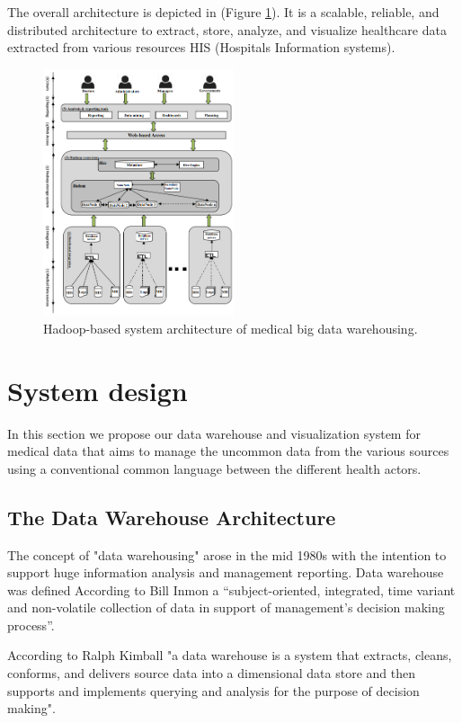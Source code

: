 \begin{itemize}
    The overall architecture is depicted in (Figure \ref{fig:bigdatarelated}). It is a scalable, reliable, and distributed architecture to extract, store, analyze, and visualize healthcare data extracted from various resources HIS (Hospitals Information systems).
    \begin{figure}[h!]
      \center
      \includegraphics[width=0.50\textwidth]{images/chapter2/relatedworkHadoop.PNG}
      \caption{Hadoop-based system
      architecture of medical big data warehousing.}
      \label{fig:bigdatarelated}
    \end{figure}
\end{itemize}


\section{System design}
In this section we propose our data warehouse and visualization system for medical data that aims to manage the uncommon data from the various sources using a conventional common language between the different health actors.
\subsection{The Data Warehouse Architecture}
The concept of "data warehousing" arose in the mid 1980s with the intention to support huge information analysis and management reporting\cite{wahDevelopmentDataWarehouse2009}. Data warehouse was defined According to Bill Inmon a “subject-oriented, integrated, time variant and non-volatile collection of data in support of management’s decision making process”\cite{inmonBuildingDataWarehouse2005}.
 
 
According to Ralph Kimball "a data warehouse is a system that extracts, cleans, conforms, and delivers source data into a dimensional data store and then supports and implements querying and analysis for the purpose of decision making"\cite{kimballDataWarehouseETLToolkit2011}.

